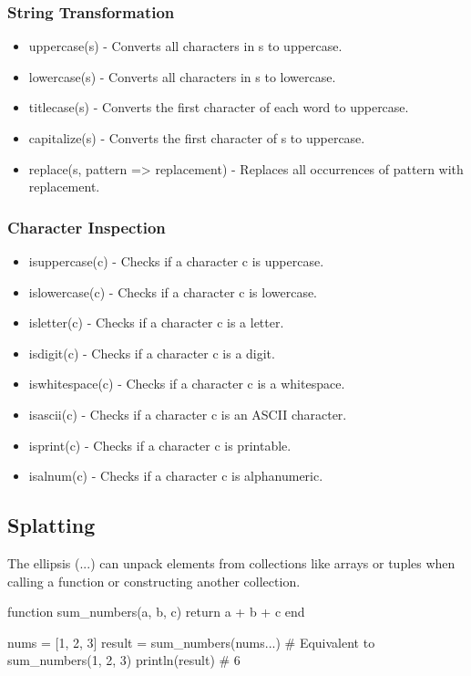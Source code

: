 \documentclass{report}
\begin{document}
    \bigbreak \noindent 
    \subsubsection{String Transformation}
    \begin{itemize}
        \item uppercase(s) - Converts all characters in s to uppercase.
        \item lowercase(s) - Converts all characters in s to lowercase.
        \item titlecase(s) - Converts the first character of each word to uppercase.
        \item capitalize(s) - Converts the first character of s to uppercase.
        \item replace(s, pattern => replacement) - Replaces all occurrences of pattern with replacement.
    \end{itemize}

    \bigbreak \noindent 
    \subsubsection{Character Inspection }
    \begin{itemize}
        \item isuppercase(c) - Checks if a character c is uppercase.
        \item islowercase(c) - Checks if a character c is lowercase.
        \item isletter(c) - Checks if a character c is a letter.
        \item isdigit(c) - Checks if a character c is a digit.
        \item iswhitespace(c) - Checks if a character c is a whitespace.
        \item isascii(c) - Checks if a character c is an ASCII character.
        \item isprint(c) - Checks if a character c is printable.
        \item isalnum(c) - Checks if a character c is alphanumeric.
    \end{itemize}

    \pagebreak 
    \bigbreak \noindent 
    \subsection{Splatting}
    \bigbreak \noindent 
    The ellipsis (...) can unpack elements from collections like arrays or tuples when calling a function or constructing another collection.
    \bigbreak \noindent 
    \begin{jlcode}
        function sum_numbers(a, b, c)
            return a + b + c
        end

        nums = [1, 2, 3]
        result = sum_numbers(nums...)  # Equivalent to sum_numbers(1, 2, 3)
        println(result)  # 6
    \end{jlcode}
\end{document}
